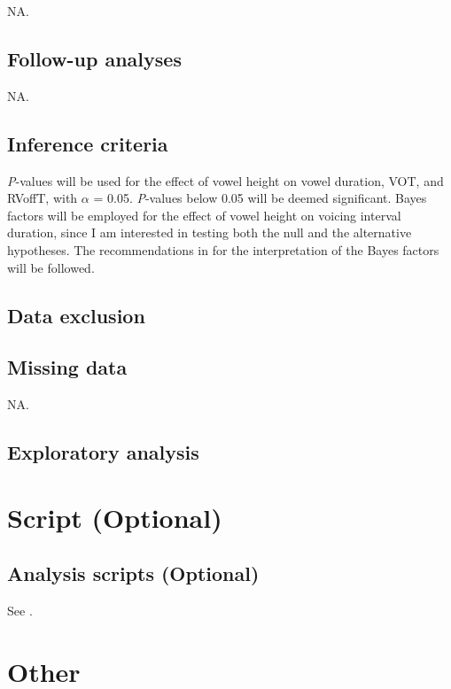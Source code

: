 \documentclass[11pt,]{article}
\begin{document}
NA.

\subsection{Follow-up analyses}\label{follow-up-analyses}

NA.

\subsection{Inference criteria}\label{inference-criteria}

\emph{P}-values will be used for the effect of vowel height on vowel
duration, VOT, and RVoffT, with \(\alpha\) = 0.05. \emph{P}-values below
0.05 will be deemed significant. Bayes factors will be employed for the
effect of vowel height on voicing interval duration, since I am
interested in testing both the null and the alternative hypotheses. The
recommendations in \citet[139]{raftery1995} for the interpretation of
the Bayes factors will be followed.

\subsection{Data exclusion}\label{data-exclusion}

\subsection{Missing data}\label{missing-data}

NA.

\subsection{Exploratory analysis}\label{exploratory-analysis}

\section{Script (Optional)}\label{script-optional}

\subsection{Analysis scripts
(Optional)}\label{analysis-scripts-optional}

See .

\section{Other}\label{other}

\label{s:other}


\end{document}
